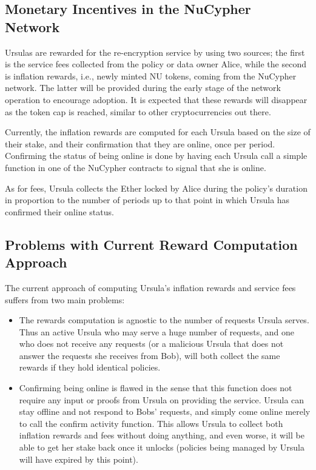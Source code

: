 \subsection{Monetary Incentives in the NuCypher Network}
Ursulas are rewarded for the re-encryption service by using two sources; 
the first is the service fees collected from the policy or data 
owner Alice, while the second is inflation rewards, i.e., newly minted
NU tokens, coming from the NuCypher network. The latter will be provided during the 
early stage of the network operation to encourage 
adoption. It is expected that these rewards will disappear as the token cap is 
reached, similar to other cryptocurrencies out there.


Currently, the inflation rewards are computed for each Ursula based on the size of their stake, and their confirmation that they are online, once per period. Confirming the status of being online is done by having each Ursula call a 
simple function in one of the NuCypher contracts to signal that she is online.

As for fees, Ursula collects the Ether locked by Alice during the policy's duration in proportion to the number of periods up to that point in which Ursula has confirmed their online status. 


\subsection{Problems with Current Reward Computation Approach}
The current approach of computing Ursula's inflation rewards and service fees suffers from two
main problems:
\begin{itemize}
\setlength{\itemsep}{0pt}
\item The rewards computation is agnostic to the number of 
requests Ursula serves. Thus an active Ursula who may serve a huge number of 
requests, and one who does not receive any requests (or a
malicious Ursula that does not answer the requests she receives from Bob), will 
both collect the same rewards if they hold identical policies.
\item Confirming being online is flawed in the sense that this function does 
not require any input or proofs from Ursula on providing the service. Ursula 
can stay offline and not respond to Bobs' requests, and simply come online merely to call the confirm activity
function. This allows Ursula to collect both inflation rewards 
and fees without doing anything, and even worse, it will be able to get her stake back once it unlocks (policies being managed by Ursula will have expired by this point). 
\end{itemize}



